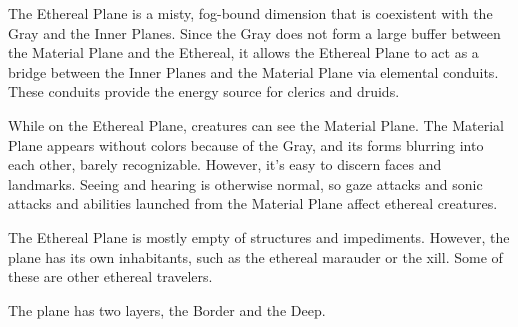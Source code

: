 The Ethereal Plane is a misty, fog-bound dimension that is coexistent with the Gray and the Inner Planes. Since the Gray does not form a large buffer between the Material Plane and the Ethereal, it allows the Ethereal Plane to act as a bridge between the Inner Planes and the Material Plane via elemental conduits. These conduits provide the energy source for clerics and druids.

While on the Ethereal Plane, creatures can see the Material Plane. The Material Plane appears without colors because of the Gray, and its forms blurring into each other, barely recognizable. However, it's easy to discern faces and landmarks. Seeing and hearing is otherwise normal, so gaze attacks and sonic attacks and abilities launched from the Material Plane affect ethereal creatures.

The Ethereal Plane is mostly empty of structures and impediments. However, the plane has its own inhabitants, such as the ethereal marauder or the xill. Some of these are other ethereal travelers.

The plane has two layers, the Border and the Deep.

\begin{figure}[b!]
\centering
{}
\end{figure}

